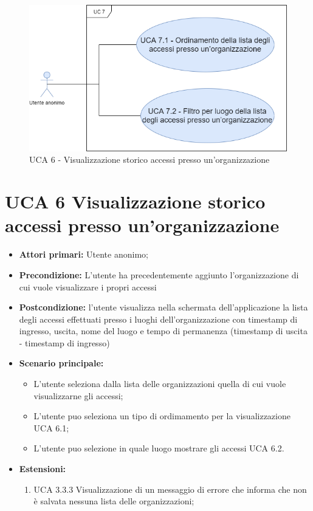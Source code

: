 \newpage
\begin{figure}[h]
	\centering
	\caption{UCA 6 - Visualizzazione storico accessi presso un’organizzazione}
	\includegraphics[scale=0.5]{sezioni/UseCase/Immagini/UCA7.png}
\end{figure}
\section{UCA 6 Visualizzazione storico accessi presso un’organizzazione}%
\begin{itemize}
\item \textbf{Attori primari:} Utente anonimo;
\item \textbf{Precondizione:} L’utente ha precedentemente aggiunto l’organizzazione di cui vuole visualizzare i propri accessi 
\item \textbf{Postcondizione:} l’utente visualizza nella schermata dell’applicazione la lista degli accessi effettuati presso i luoghi dell’organizzazione con timestamp di ingresso, uscita, nome del luogo e tempo di permanenza (timestamp di uscita - timestamp di ingresso)
\item \textbf{Scenario principale:} 
\begin{itemize}
\item L’utente seleziona dalla lista delle organizzazioni quella di cui vuole visualizzarne gli accessi;
\item L'utente puo seleziona un tipo di ordimamento per la visualizzazione UCA 6.1;
\item L'utente puo selezione in quale luogo mostrare gli accessi UCA 6.2.
\end{itemize}
\item \textbf{Estensioni:}
\begin{enumerate}
	\item UCA 3.3.3 Visualizzazione di un messaggio di errore che informa che non è salvata nessuna lista delle organizzazioni;	
\end{enumerate}	
\end{itemize}

